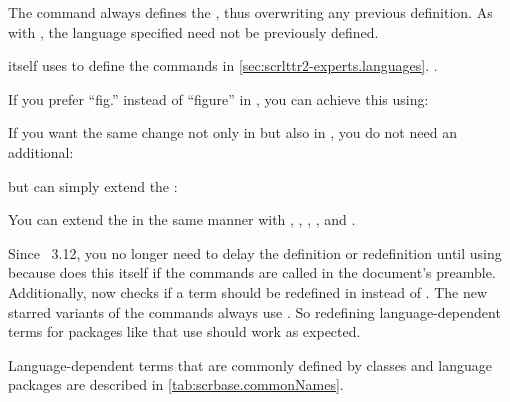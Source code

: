 The  command always
defines the , thus overwriting any previous definition. As with
, the language specified need not be previously
defined.

\KOMAScript{} itself uses  to define the commands in
\autoref{sec:scrlttr2-experts.languages}.
.

\begin{Example}
  If you prefer ``fig.'' instead of ``figure'' in , you can
  achieve this using:
\begin{lstcode}
\end{lstcode}
  If you want the same change not only in  but also in
  , you do not need an additional:
\begin{lstcode}
\end{lstcode}
  but can simply extend the :
\begin{lstcode}
\end{lstcode}
  You can extend the  in the same manner with
  , , , ,
  and .
\end{Example}

Since \KOMAScript~3.12, you no longer need
to delay the definition or redefinition until
 using  because
 does this itself if the commands are called in the
document's preamble. Additionally,  now checks if a term
should be redefined in  instead of
. The new starred variants of the commands
always use . So redefining language-dependent
terms for packages like  that use
 should work as expected.

Language-dependent terms that are commonly defined by classes and language
packages are described in \autoref{tab:scrbase.commonNames}.

